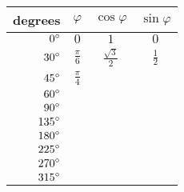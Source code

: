 \begin{tabular}{rccc} \toprule
degrees       & $\varphi$       & $\cos\varphi$        & $\sin\varphi$ \\\midrule
${0}^{\circ}$  & $0$             & $1$                  & $0$           \\[6pt]
${30}^{\circ}$ & $\frac{\pi}{6}$ & $\frac{\sqrt{3}}{2}$ & $\frac{1}{2}$ \\[6pt]
${45}^{\circ}$ & $\frac{\pi}{4}$                                        \\[6pt]
${60}^{\circ}$                                                          \\[6pt]
${90}^{\circ}$                                                          \\[6pt]
${135}^{\circ}$                                                         \\[6pt]
${180}^{\circ}$                                                         \\[6pt]
${225}^{\circ}$                                                         \\[6pt]
${270}^{\circ}$                                                         \\[6pt]
${315}^{\circ}$                                                         \\\bottomrule
\end{tabular}
